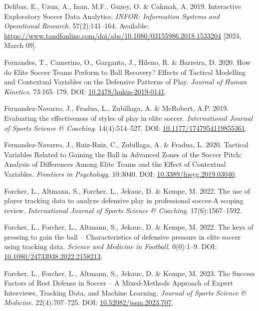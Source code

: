 \documentclass[
  a4paper,
  twoside]{uoe-thesis-template}
\newlength{\cslhangindent}
\newenvironment{CSLReferences}[2] %
 {\begin{list}{}{%
  \setlength{\itemindent}{0pt}
  \setlength{\leftmargin}{0pt}
  \setlength{\parsep}{0pt}
  \ifodd #1
   \setlength{\leftmargin}{\cslhangindent}
   \setlength{\itemindent}{-1\cslhangindent}
  \fi
  \setlength{\itemsep}{#2\baselineskip}}}
 {\end{list}}
\begin{document}
\begin{CSLReferences}{0}{0}
Delibas, E., Uzun, A., Inan, M.F., Guzey, O. \& Cakmak, A. 2019.
Interactive {Exploratory} {Soccer} {Data} {Analytics}. \emph{INFOR:
Information Systems and Operational Research}. 57(2):141--164.
Available:
\url{https://www.tandfonline.com/doi/abs/10.1080/03155986.2018.1533204}
{[}2024, March 09{]}.

Fernandes, T., Camerino, O., Garganta, J., Hileno, R. \& Barreira, D.
2020. How do {Elite} {Soccer} {Teams} {Perform} to {Ball} {Recovery}?
{Effects} of {Tactical} {Modelling} and {Contextual} {Variables} on the
{Defensive} {Patterns} of {Play}. \emph{Journal of Human Kinetics}.
73:165--179. DOI:
\href{https://doi.org/10.2478/hukin-2019-0141}{10.2478/hukin-2019-0141}.

Fernandez-Navarro, J., Fradua, L., Zubillaga, A. \& McRobert, A.P. 2019.
Evaluating the effectiveness of styles of play in elite soccer.
\emph{International Journal of Sports Science \& Coaching}.
14(4):514--527. DOI:
\href{https://doi.org/10.1177/1747954119855361}{10.1177/1747954119855361}.

Fernandez-Navarro, J., Ruiz-Ruiz, C., Zubillaga, A. \& Fradua, L. 2020.
Tactical {Variables} {Related} to {Gaining} the {Ball} in {Advanced}
{Zones} of the {Soccer} {Pitch}: {Analysis} of {Differences} {Among}
{Elite} {Teams} and the {Effect} of {Contextual} {Variables}.
\emph{Frontiers in Psychology}. 10:3040. DOI:
\href{https://doi.org/10.3389/fpsyg.2019.03040}{10.3389/fpsyg.2019.03040}.

Forcher, L., Altmann, S., Forcher, L., Jekauc, D. \& Kempe, M. 2022. The
use of player tracking data to analyze defensive play in professional
soccer-{A} scoping review. \emph{International Journal of Sports Science
\& Coaching}. 17(6):1567--1592.

Forcher, L., Forcher, L., Altmann, S., Jekauc, D. \& Kempe, M. 2022. The
keys of pressing to gain the ball -- {Characteristics} of defensive
pressure in elite soccer using tracking data. \emph{Science and Medicine
in Football}. 0(0):1--9. DOI:
\href{https://doi.org/10.1080/24733938.2022.2158213}{10.1080/24733938.2022.2158213}.

Forcher, L., Forcher, L., Altmann, S., Jekauc, D. \& Kempe, M. 2023. The
{Success} {Factors} of {Rest} {Defense} in {Soccer} -- {A}
{Mixed}-{Methods} {Approach} of {Expert} {Interviews}, {Tracking}
{Data}, and {Machine} {Learning}. \emph{Journal of Sports Science \&
Medicine}. 22(4):707--725. DOI:
\href{https://doi.org/10.52082/jssm.2023.707}{10.52082/jssm.2023.707}.


\end{CSLReferences}
\end{document}
